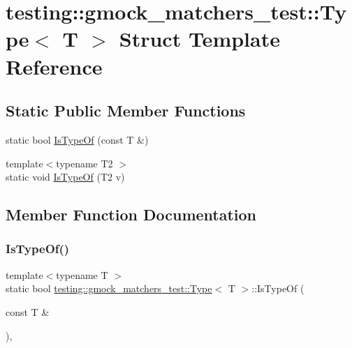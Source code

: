 \hypertarget{structtesting_1_1gmock__matchers__test_1_1Type}{}\section{testing\+::gmock\+\_\+matchers\+\_\+test\+::Type$<$ T $>$ Struct Template Reference}
\label{structtesting_1_1gmock__matchers__test_1_1Type}
\subsection*{Static Public Member Functions}
\begin{DoxyCompactItemize}
\item 
static bool \mbox{\hyperlink{structtesting_1_1gmock__matchers__test_1_1Type_ad0b8d166a185471db49aa9009520d74f}{Is\+Type\+Of}} (const T \&)
\item 
{\footnotesize template$<$typename T2 $>$ }\\static void \mbox{\hyperlink{structtesting_1_1gmock__matchers__test_1_1Type_a5451b10be4ff47bd2dc3741eb70dde59}{Is\+Type\+Of}} (T2 v)
\end{DoxyCompactItemize}


\subsection{Member Function Documentation}
\mbox{\label{structtesting_1_1gmock__matchers__test_1_1Type_ad0b8d166a185471db49aa9009520d74f}} 
\subsubsection{\texorpdfstring{IsTypeOf()}{IsTypeOf()}\hspace{0.1cm}{\footnotesize\ttfamily [1/2]}}
{\footnotesize\ttfamily template$<$typename T $>$ \\
static bool \mbox{\hyperlink{structtesting_1_1gmock__matchers__test_1_1Type}{testing\+::gmock\+\_\+matchers\+\_\+test\+::\+Type}}$<$ T $>$\+::Is\+Type\+Of (\begin{DoxyParamCaption}\item[{const T \&}]{ }\end{DoxyParamCaption})\hspace{0.3cm}{\ttfamily [inline]}, {\ttfamily [static]}}

